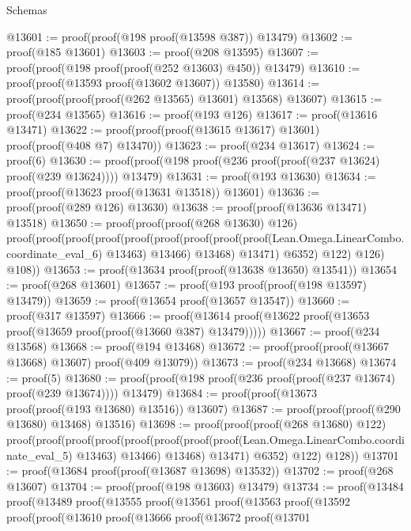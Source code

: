 \begin{lexlean}{Schemas}
\begin{coremodule}
@13601 := proof(proof(@198 proof(@13598 @387)) @13479)
@13602 := proof(@185 @13601)
@13603 := proof(@208 @13595)
@13607 := proof(proof(@198 proof(proof(@252 @13603) @450)) @13479)
@13610 := proof(proof(@13593 proof(@13602 @13607)) @13580)
@13614 := proof(proof(proof(proof(@262 @13565) @13601) @13568) @13607)
@13615 := proof(@234 @13565)
@13616 := proof(@193 @126)
@13617 := proof(@13616 @13471)
@13622 := proof(proof(proof(@13615 @13617) @13601) proof(proof(@408 @7) @13470))
@13623 := proof(@234 @13617)
@13624 := proof(6)
@13630 := proof(proof(@198 proof(@236 proof(proof(@237 @13624) proof(@239 @13624)))) @13479)
@13631 := proof(@193 @13630)
@13634 := proof(proof(@13623 proof(@13631 @13518)) @13601)
@13636 := proof(proof(@289 @126) @13630)
@13638 := proof(proof(@13636 @13471) @13518)
@13650 := proof(proof(proof(@268 @13630) @126)
      proof(proof(proof(proof(proof(proof(proof(proof(proof(Lean.Omega.LinearCombo.coordinate_eval_6)
                        @13463)
                      @13466)
                    @13468)
                  @13471)
                @6352)
              @122)
            @126)
          @108))
@13653 := proof(@13634 proof(proof(@13638 @13650) @13541))
@13654 := proof(@268 @13601)
@13657 := proof(@193 proof(proof(@198 @13597) @13479))
@13659 := proof(@13654 proof(@13657 @13547))
@13660 := proof(@317 @13597)
@13666 := proof(@13614 proof(@13622 proof(@13653 proof(@13659 proof(proof(@13660 @387) @13479)))))
@13667 := proof(@234 @13568)
@13668 := proof(@194 @13468)
@13672 := proof(proof(proof(@13667 @13668) @13607) proof(@409 @13079))
@13673 := proof(@234 @13668)
@13674 := proof(5)
@13680 := proof(proof(@198 proof(@236 proof(proof(@237 @13674) proof(@239 @13674)))) @13479)
@13684 := proof(proof(@13673 proof(proof(@193 @13680) @13516)) @13607)
@13687 := proof(proof(proof(@290 @13680) @13468) @13516)
@13698 := proof(proof(proof(@268 @13680) @122)
      proof(proof(proof(proof(proof(proof(proof(proof(Lean.Omega.LinearCombo.coordinate_eval_5)
                      @13463)
                    @13466)
                  @13468)
                @13471)
              @6352)
            @122)
          @128))
@13701 := proof(@13684 proof(proof(@13687 @13698) @13532))
@13702 := proof(@268 @13607)
@13704 := proof(proof(@198 @13603) @13479)
@13734 := proof(@13484
      proof(@13489
          proof(@13555
              proof(@13561
                  proof(@13563
                      proof(@13592
                          proof(proof(@13610
                                proof(@13666
                                    proof(@13672
                                        proof(@13701

\end{coremodule}
\end{lexlean}
